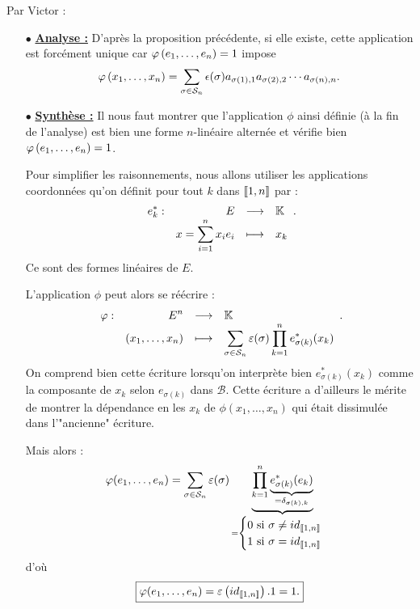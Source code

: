 \documentclass{magnolia}
\begin{document}
\begin{preuve}
Par Victor :

\begin{itemize}
\item[$\bullet$] \textbf{\underline{Analyse :}} D'après la proposition précédente, si elle existe, cette application est forcément unique car $\varphi\left(e_1,\ldots,e_n\right)=1$ impose $$\phi\p{x_1,\ldots,x_n}=\sum_{\sigma\in\gsym{n}} \signat{\sigma}
  a_{\sigma\p{1},1}a_{\sigma\p{2},2}\cdots a_{\sigma(n),n}.$$

\item[$\bullet$] \textbf{\underline{Synthèse :}}
 Il nous faut montrer que l'application $\phi$ ainsi définie (à la fin de l'analyse) est bien une forme $n$-linéaire alternée et vérifie bien $\varphi\left(e_1,\ldots,e_n\right)=1$.

Pour simplifier les raisonnements, nous allons utiliser les applications coordonnées qu'on définit pour tout $k$ dans $\left\llbracket 1,n\right\rrbracket$ par :
$$\begin{array}[t]{lrcl} \displaystyle{e_k^*} : & \displaystyle{E} & \longrightarrow & \displaystyle{\ensuremath{\mathbb{K}}} \\ & \displaystyle{x=\sum_{i=1}^nx_ie_i} & \longmapsto & \displaystyle{x_k} \end{array}.$$
Ce sont des formes linéaires de $E$.

\bigskip
L'application $\phi$ peut alors se réécrire :
$$\begin{array}[t]{lrcl} \displaystyle{\varphi} : & \displaystyle{E^n} & \longrightarrow & \displaystyle{\ensuremath{\mathbb{K}}} \\ & \displaystyle{(x_1,\ldots,x_n)} & \longmapsto & \displaystyle{\sum_{\sigma\in \mathcal{S}_{n}}\varepsilon(\sigma)\prod_{k=1}^ne_{\sigma(k)}^*(x_k)} \end{array}.$$
On comprend bien cette écriture lorsqu'on interprète bien $e_{\sigma(k)}^*(x_k)$ comme la composante de $x_k$ selon $e_{\sigma(k)}$ dans $\mathcal{B}$. Cette écriture a d'ailleurs le mérite de montrer la dépendance en les $x_k$ de $\phi(x_1,\ldots,x_n)$ qui était dissimulée dans l'"ancienne" écriture.

Mais alors :
$$\varphi(e_1,\ldots,e_n)=\sum_{\sigma\in \mathcal{S}_{n}}\varepsilon(\sigma)\underbrace{\prod_{k=1}^n\underbrace{e_{\sigma(k)}^*(e_k)}_{=\delta_{\sigma(k),k}}}_{=\begin{cases}0 \text{ si } \sigma\neq id_{\left\llbracket 1,n\right\rrbracket}\\
1 \text{ si } \sigma= id_{\left\llbracket 1,n\right\rrbracket}\end{cases}}$$
d'où $$\boxed{\varphi(e_1,\ldots,e_n)=\varepsilon\left(id_{\left\llbracket 1,n\right\rrbracket}\right).1=1.}$$


\end{itemize}
\end{preuve}
\end{document}
